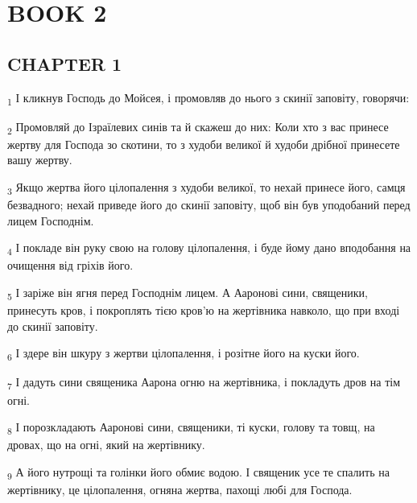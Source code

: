 \section{BOOK 2}
\subsection{CHAPTER 1}
\begin{tcolorbox}
\textsubscript{1} І кликнув Господь до Мойсея, і промовляв до нього з скинії заповіту, говорячи:
\end{tcolorbox}
\begin{tcolorbox}
\textsubscript{2} Промовляй до Ізраїлевих синів та й скажеш до них: Коли хто з вас принесе жертву для Господа зо скотини, то з худоби великої й худоби дрібної принесете вашу жертву.
\end{tcolorbox}
\begin{tcolorbox}
\textsubscript{3} Якщо жертва його цілопалення з худоби великої, то нехай принесе його, самця безвадного; нехай приведе його до скинії заповіту, щоб він був уподобаний перед лицем Господнім.
\end{tcolorbox}
\begin{tcolorbox}
\textsubscript{4} І покладе він руку свою на голову цілопалення, і буде йому дано вподобання на очищення від гріхів його.
\end{tcolorbox}
\begin{tcolorbox}
\textsubscript{5} І заріже він ягня перед Господнім лицем. А Ааронові сини, священики, принесуть кров, і покроплять тією кров'ю на жертівника навколо, що при вході до скинії заповіту.
\end{tcolorbox}
\begin{tcolorbox}
\textsubscript{6} І здере він шкуру з жертви цілопалення, і розітне його на куски його.
\end{tcolorbox}
\begin{tcolorbox}
\textsubscript{7} І дадуть сини священика Аарона огню на жертівника, і покладуть дров на тім огні.
\end{tcolorbox}
\begin{tcolorbox}
\textsubscript{8} І порозкладають Ааронові сини, священики, ті куски, голову та товщ, на дровах, що на огні, який на жертівнику.
\end{tcolorbox}
\begin{tcolorbox}
\textsubscript{9} А його нутрощі та голінки його обмиє водою. І священик усе те спалить на жертівнику, це цілопалення, огняна жертва, пахощі любі для Господа.
\end{tcolorbox}
